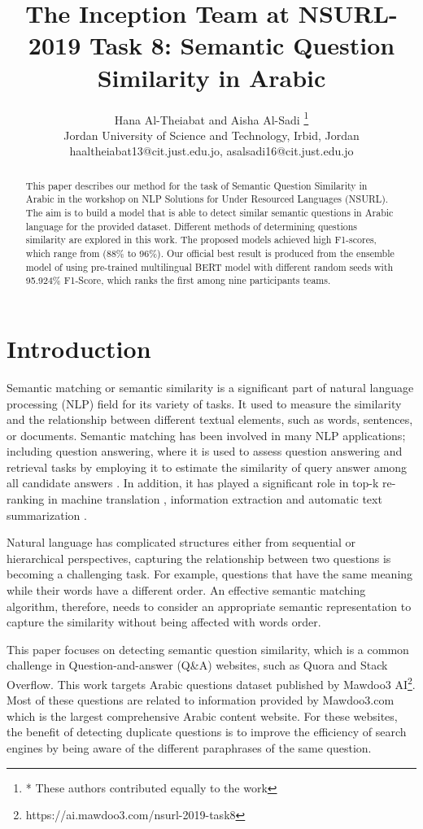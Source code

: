 \documentclass[11pt,a4paper]{article}
\title{The Inception Team at NSURL-2019 Task 8: Semantic Question Similarity in Arabic}
\author{Hana Al-Theiabat and
  Aisha Al-Sadi \thanks{* These authors contributed equally to the work}
    \\Jordan University of Science and Technology, Irbid, Jordan \\
  haaltheiabat13@cit.just.edu.jo,  asalsadi16@cit.just.edu.jo
  }
\date{}
\begin{document}
\maketitle
\begin{abstract}
This paper describes our method for the task of Semantic Question Similarity in Arabic in the workshop on NLP Solutions for Under Resourced Languages (NSURL). The aim is to build a model that is able to detect similar semantic questions in Arabic language for the provided dataset. Different methods of determining questions similarity are explored in this work. The proposed models achieved high F1-scores, which range from (88\% to 96\%). Our official best result is produced from the ensemble model of using pre-trained multilingual BERT model with different random seeds with 95.924\%  F1-Score, which ranks the first among nine participants teams.
\end{abstract}


\section{Introduction}

Semantic matching or semantic similarity is a significant part of natural language processing (NLP) field for its variety of tasks. It used to measure the similarity and the relationship between different textual elements, such as words, sentences, or documents. Semantic matching has been involved in many NLP applications; including question answering, where it is used to assess question answering and retrieval tasks by employing it to estimate the similarity of query answer among all candidate answers \cite{wang2016sentence}. In addition, it has played a significant role in top-k re-ranking in machine translation \cite{brown1993mathematics}, information extraction \cite{grishman1997information} and automatic text summarization \cite{ponzanelli2015summarizing}.

Natural language has complicated structures either from sequential or hierarchical perspectives, capturing the relationship between two questions is becoming a challenging task. For example, questions that have the same meaning while their words have a different order. An effective semantic matching algorithm, therefore, needs to consider an appropriate semantic representation to capture the similarity without being affected with words order. 

This paper focuses on detecting semantic question similarity, which is a common challenge in Question-and-answer (Q\&A) websites, such as Quora and Stack Overflow. This work targets Arabic questions dataset published by Mawdoo3 AI\footnote{ https://ai.mawdoo3.com/nsurl-2019-task8}. Most of these questions are related to information provided by Mawdoo3.com which is  the largest comprehensive Arabic content website.
For these websites, the benefit of detecting duplicate questions is to improve the efficiency of search engines by being aware of the different paraphrases of the same question.
\end{document}
